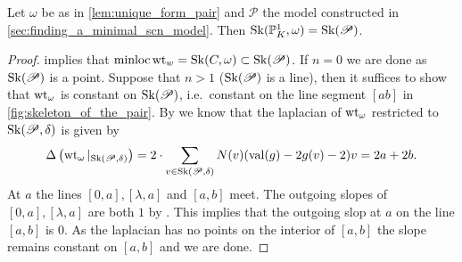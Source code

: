 \begin{proposition}\label{prop:model_P_is_KS}
	Let $\omega$ be as in \cref{lem:unique_form_pair} and $\mathscr P$ the model constructed in \cref{sec:finding_a_minimal_scn_model}.
	Then $\operatorname{Sk}(\mathbb{P}^{1}_K, \omega) = \operatorname{Sk}(\mathscr P)$. 
\end{proposition}
\begin{proof}
	 implies that $\operatorname{minloc} \operatorname{wt}_{w} = \operatorname{Sk}(C, \omega) \subset \operatorname{Sk}(\mathscr P) $. 
	If $n = 0$ we are done as $\operatorname{Sk}(\mathscr P) $ is a point. 
	Suppose that $n > 1$ ($\operatorname{Sk}(\mathscr P)$ is a line), then 
	it suffices to show that $\operatorname{wt}_\omega$ is constant on $\operatorname{Sk}(\mathscr P)$, i.e.\ constant on the line segment $[ab]$ in \cref{fig:skeleton_of_the_pair}. 
	By \cite[thm.\ 3.2.3.(3)]{bakerWeightFunctionsBerkovich2016} we know that the laplacian of $\operatorname{wt}_\omega$ restricted to $\operatorname{Sk}(\mathscr P, \delta)$ is given by \[
		\Delta\left(\operatorname{wt}_\omega|_{\operatorname{Sk}(\mathscr P, \delta)}\right) = 2\cdot \sum_{v \in \operatorname{Sk}(\mathscr P, \delta)} N(v)(\operatorname{val} (g) - 2g(v) - 2)v = 2a + 2b
	.\] 
	At $a$ the lines $[0, a],[\lambda, a]$ and  $[a, b]$ meet. 
	The outgoing slopes of  $[0, a], [\lambda, a]$ are both $1$ by \cite[3.2.3.(2)]{bakerWeightFunctionsBerkovich2016}. 
	This implies that the outgoing slop at $a$ on the line$ [a, b]$ is $0$. 
	As the laplacian has no points on the interior of $[a, b]$ the slope remains constant on $[a, b]$ and we are done. 
\end{proof}



